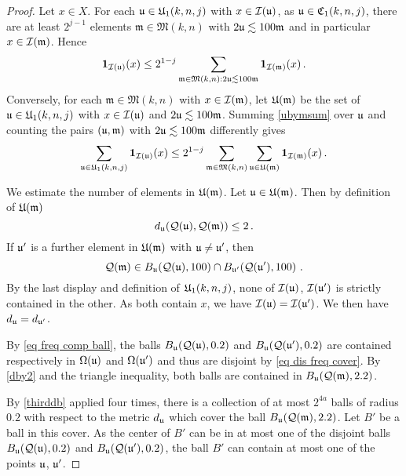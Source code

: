 {\begin{proof}
Let $x\in X$. For each
$\fu\in \fU_1(k,n,j)$ with $x\in \sc(\fu)$, as $\fu \in \fC_1(k,n,j)$,
there are at least $2^{j-1}$  elements $\mathfrak{m}\in \mathfrak{M}(k,n)$
with $2\fu \lesssim 100\mathfrak{m}$ and in particular
$x\in \sc(\mathfrak{m})$. Hence
\begin{equation}\label{ubymsum}
     \mathbf{1}_{\sc(\fu)}(x)
    \le 2^{1-j}\sum_{\mathfrak{m} \in \mathfrak{M}(k,n): 2\fu\lesssim 100 \mathfrak{m}} \mathbf{1}_{\sc(\mathfrak{m})}(x)\, .
\end{equation}
Conversely, for each $\mathfrak{m}\in \mathfrak{M}(k,n)$
with $x\in \sc(\mathfrak{m})$,
let $\fU(\mathfrak{m})$ be the set of
$\fu\in \fU_1(k,n,j)$ with $x\in \sc(\fu)$
and $2\fu \lesssim 100\mathfrak{m}$.
Summing \eqref{ubymsum} over $\fu$ and counting the pairs
$(\fu,\mathfrak{m})$ with $2\fu \lesssim 100\mathfrak{m}$
differently gives
\begin{equation}\label{usumbymsum}
     \sum_{\fu\in \fU_1(k,n,j)} \mathbf{1}_{\sc(\fu)}(x)
    \le 2^{1-j}\sum_{\mathfrak{m} \in \mathfrak{M}(k,n)}
    \sum_{\fu \in \fU(\mathfrak{m})} \mathbf{1}_{\sc(\mathfrak{m})}(x)\, .
\end{equation}



We estimate the number of elements in $\fU(\mathfrak{m})$.
Let $\fu  \in \fU(\mathfrak{m})$.
Then by definition of
$\fU(\mathfrak{m})$
\begin{equation}\label{dby2}
     d_{\fu}(\fcc(\fu),\fcc(\mathfrak{m}))\le 2\, .
\end{equation}
If $\fu'$ is a further element in $\fU(\mathfrak{m})$ with $\fu\neq \fu'$, then
\begin{equation}
    \fcc(\mathfrak{m})
    \in B_{\fu}(\fcc(\fu),100)\cap B_{\fu'}(\fcc(\fu'),100)\ .
\end{equation}
By the last display and definition of $\fU_1(k,n,j)$, none of $\sc(\fu)$, $\sc(\fu')$ is strictly contained in the other. As both contain $x$, we have $\sc(\fu)=\sc(\fu')$.
We then have $d_{\fu}=d_{\fu'}$.

By \eqref{eq freq comp ball}, the balls
$B_{\fu}(\fcc(\fu),0.2)$ and
$B_{\fu}(\fcc(\fu'),0.2)$ are
contained respectively in $\fc(\fu)$
and $\fc(\fu')$ and thus are disjoint by \eqref{eq dis freq cover}.
By \eqref{dby2} and the triangle inequality, both balls are contained in $B_{\fu}(\fcc(\mathfrak{m}), 2.2)$.

By \eqref{thirddb} applied four times, there is a collection of at most
$2^{4a}$ balls of radius $0.2$ with respect to the metric $d_{\fu}$ which cover the ball $B_{\fu}(\fcc(\mathfrak{m}),2.2)$.
Let $B'$ be a ball in this cover.
As the center of $B'$  can be in at most one of the disjoint balls
$B_{\fu}(\fcc(\fu),0.2)$ and
$B_{\fu}(\fcc(\fu'),0.2)$,
the ball $B'$ can contain at most
one of the points $\fu$, $\fu'$.


\end{proof}}
